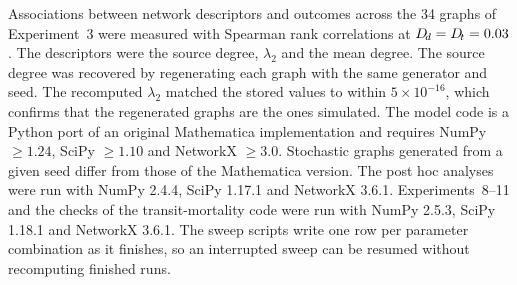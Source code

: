 Associations between network descriptors and outcomes across the 34 graphs of Experiment~3 were measured with Spearman rank correlations at $D_{\!d} = D_{\!t} = 0.03$. The descriptors were the source degree, $\lambda_2$ and the mean degree. The source degree was recovered by regenerating each graph with the same generator and seed. The recomputed $\lambda_2$ matched the stored values to within $5\times10^{-16}$, which confirms that the regenerated graphs are the ones simulated. The model code is a Python port of an original Mathematica implementation and requires NumPy $\ge 1.24$, SciPy $\ge 1.10$ and NetworkX $\ge 3.0$. Stochastic graphs generated from a given seed differ from those of the Mathematica version. The post hoc analyses were run with NumPy 2.4.4, SciPy 1.17.1 and NetworkX 3.6.1. Experiments~8--11 and the checks of the transit-mortality code were run with NumPy 2.5.3, SciPy 1.18.1 and NetworkX 3.6.1. The sweep scripts write one row per parameter combination as it finishes, so an interrupted sweep can be resumed without recomputing finished runs.
